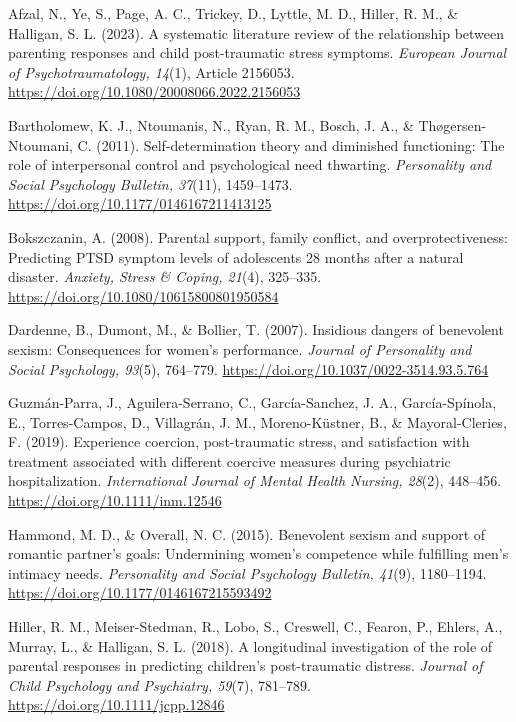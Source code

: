 \documentclass[11pt,a4paper,oneside,headinclude=true,footinclude=false]{scrartcl}
\newenvironment{apareferences}{%
  \par\begingroup\small\setlength{\leftskip}{6mm}%
  \setlength{\parindent}{-6mm}%
  \setlength{\parskip}{9pt plus 1pt minus 1pt}%
}{\par\endgroup}
\begin{document}
\begin{apareferences}
Afzal, N., Ye, S., Page, A. C., Trickey, D., Lyttle, M. D., Hiller, R.
M., \& Halligan, S. L. (2023). A systematic literature review of the
relationship between parenting responses and child post-traumatic stress
symptoms. \emph{European Journal of Psychotraumatology, 14}(1), Article
2156053. \url{https://doi.org/10.1080/20008066.2022.2156053}

Bartholomew, K. J., Ntoumanis, N., Ryan, R. M., Bosch, J. A., \&
Thøgersen-Ntoumani, C. (2011). Self-determination theory and diminished
functioning: The role of interpersonal control and psychological need
thwarting. \emph{Personality and Social Psychology Bulletin, 37}(11),
1459--1473. \url{https://doi.org/10.1177/0146167211413125}

Bokszczanin, A. (2008). Parental support, family conflict, and
overprotectiveness: Predicting PTSD symptom levels of adolescents 28
months after a natural disaster. \emph{Anxiety, Stress \& Coping,
21}(4), 325--335. \url{https://doi.org/10.1080/10615800801950584}

Dardenne, B., Dumont, M., \& Bollier, T. (2007). Insidious dangers of
benevolent sexism: Consequences for women's performance. \emph{Journal
of Personality and Social Psychology, 93}(5), 764--779.
\url{https://doi.org/10.1037/0022-3514.93.5.764}

Guzmán-Parra, J., Aguilera-Serrano, C., García-Sanchez, J. A.,
García-Spínola, E., Torres-Campos, D., Villagrán, J. M., Moreno-Küstner,
B., \& Mayoral-Cleries, F. (2019). Experience coercion, post-traumatic
stress, and satisfaction with treatment associated with different
coercive measures during psychiatric hospitalization.
\emph{International Journal of Mental Health Nursing, 28}(2), 448--456.
\url{https://doi.org/10.1111/inm.12546}

Hammond, M. D., \& Overall, N. C. (2015). Benevolent sexism and support
of romantic partner's goals: Undermining women's competence while
fulfilling men's intimacy needs. \emph{Personality and Social Psychology
Bulletin, 41}(9), 1180--1194.
\url{https://doi.org/10.1177/0146167215593492}

Hiller, R. M., Meiser-Stedman, R., Lobo, S., Creswell, C., Fearon, P.,
Ehlers, A., Murray, L., \& Halligan, S. L. (2018). A longitudinal
investigation of the role of parental responses in predicting children's
post-traumatic distress. \emph{Journal of Child Psychology and
Psychiatry, 59}(7), 781--789. \url{https://doi.org/10.1111/jcpp.12846}


\end{apareferences}
\end{document}
